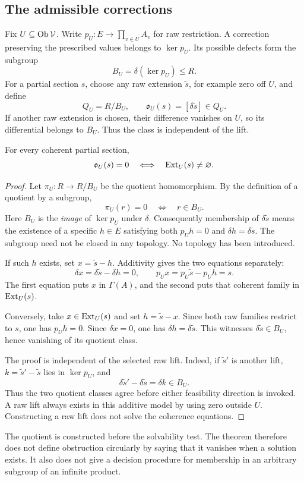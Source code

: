 \subsection{The admissible corrections}
Fix \(U\subseteq\operatorname{Ob}\mathcal V\). Write \(p_U:E\to\prod_{v\in U}A_v\) for raw restriction. A correction preserving the prescribed values belongs to \(\ker p_U\). Its possible defects form the subgroup
\[
 B_U=\delta(\ker p_U)\le R.
\]
For a partial section \(s\), choose any raw extension \(\widetilde s\), for example zero off \(U\), and define
\begin{equation}\label{KS:eq:obstruction}
 Q_U=R/B_U,\qquad
 \mathfrak o_U(s)=[\delta\widetilde s]\in Q_U.
\end{equation}
If another raw extension is chosen, their difference vanishes on \(U\), so its differential belongs to \(B_U\). Thus the class is independent of the lift.

\begin{KStheorem}\label{KS:KS09}
For every coherent partial section,
\[
 \mathfrak o_U(s)=0\quad\Longleftrightarrow\quad\operatorname{Ext}_U(s)\ne\varnothing.
\]
\end{KStheorem}
\begin{proof}
Let $\pi_U:R\to R/B_U$ be the quotient homomorphism. By the definition of a quotient by a subgroup,
\[
 \pi_U(r)=0\quad\Longleftrightarrow\quad r\in B_U.
\]
Here $B_U$ is the \emph{image} of $\ker p_U$ under $\delta$. Consequently membership of $\delta\widetilde s$ means the existence of a specific $h\in E$ satisfying both $p_Uh=0$ and $\delta h=\delta\widetilde s$. The subgroup need not be closed in any topology. No topology has been introduced.

If such $h$ exists, set $x=\widetilde s-h$. Additivity gives the two equations separately:
\[
 \delta x=\delta\widetilde s-\delta h=0,
 \qquad p_Ux=p_U\widetilde s-p_Uh=s.
\]
The first equation puts $x$ in $\Gamma(A)$, and the second puts that coherent family in $\operatorname{Ext}_U(s)$.

Conversely, take $x\in\operatorname{Ext}_U(s)$ and set $h=\widetilde s-x$. Since both raw families restrict to $s$, one has $p_Uh=0$. Since $\delta x=0$, one has $\delta h=\delta\widetilde s$. This witnesses $\delta\widetilde s\in B_U$, hence vanishing of its quotient class.

The proof is independent of the selected raw lift. Indeed, if $\widetilde s'$ is another lift, $k=\widetilde s'-\widetilde s$ lies in $\ker p_U$, and
\[
 \delta\widetilde s'-\delta\widetilde s=\delta k\in B_U.
\]
Thus the two quotient classes agree before either feasibility direction is invoked. A raw lift always exists in this additive model by using zero outside $U$. Constructing a raw lift does not solve the coherence equations.
\end{proof}
The quotient is constructed before the solvability test. The theorem therefore does not define obstruction circularly by saying that it vanishes when a solution exists. It also does not give a decision procedure for membership in an arbitrary subgroup of an infinite product.


